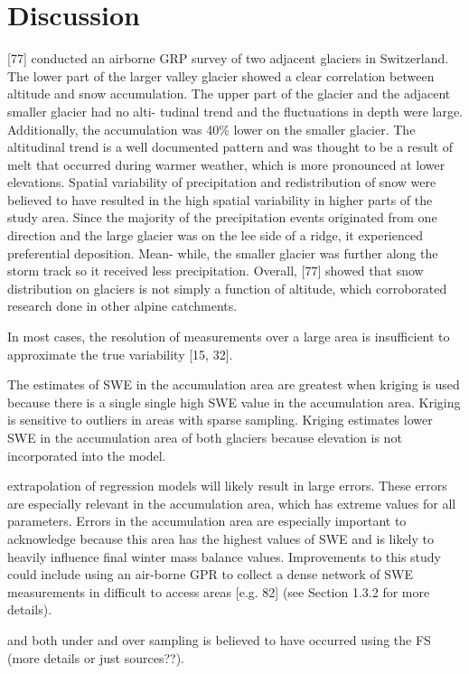 \documentclass[twocolumn,letterpaper]{igs}
\begin{document}
\section{Discussion}
[77] conducted an airborne GRP survey of two adjacent glaciers in Switzerland. The
lower part of the larger valley glacier showed a clear correlation between altitude and snow
accumulation. The upper part of the glacier and the adjacent smaller glacier had no alti-
tudinal trend and the fluctuations in depth were large. Additionally, the accumulation was
40\% lower on the smaller glacier. The altitudinal trend is a well documented pattern and
was thought to be a result of melt that occurred during warmer weather, which is more
pronounced at lower elevations. Spatial variability of precipitation and redistribution of
snow were believed to have resulted in the high spatial variability in higher parts of the
study area. Since the majority of the precipitation events originated from one direction and
the large glacier was on the lee side of a ridge, it experienced preferential deposition. Mean-
while, the smaller glacier was further along the storm track so it received less precipitation.
Overall, [77] showed that snow distribution on glaciers is not simply a function of altitude,
which corroborated research done in other alpine catchments.

 In most cases, the resolution of measurements over a large area is insufficient to
approximate the true variability [15, 32].


 The estimates of SWE in the accumulation area are greatest when kriging is used because there is a single single high SWE value in the accumulation area. Kriging is sensitive to outliers in areas with sparse sampling. Kriging estimates lower SWE in the accumulation area of both glaciers because elevation is not incorporated into the model.

extrapolation of regression models will
likely result in large errors. These errors are especially relevant in the accumulation area,
which has extreme values for all parameters. Errors in the accumulation area are especially
important to acknowledge because this area has the highest values of SWE and is likely to
heavily influence final winter mass balance values. Improvements to this study could include
using an air-borne GPR to collect a dense network of SWE measurements in difficult to
access areas [e.g. 82] (see Section 1.3.2 for more details).


 and both under and over sampling is believed to have occurred using the FS (more details or just sources??). 
\end{document}
